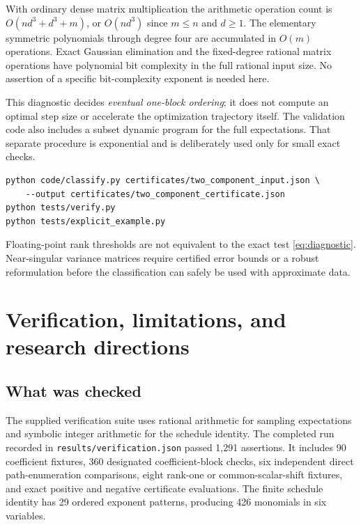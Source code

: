 \documentclass[11pt,letterpaper]{article}
\numberwithin{equation}{section}
\theoremstyle{definition}
\begin{document}
With ordinary dense matrix multiplication the arithmetic operation count is $O(nd^3+d^3+m)$, or $O(nd^3)$ since $m\le n$ and $d\ge1$. The elementary symmetric polynomials through degree four are accumulated in $O(m)$ operations. Exact Gaussian elimination and the fixed-degree rational matrix operations have polynomial bit complexity in the full rational input size. No assertion of a specific bit-complexity exponent is needed here.

This diagnostic decides \emph{eventual one-block ordering}; it does not compute an optimal step size or accelerate the optimization trajectory itself. The validation code also includes a subset dynamic program for the full expectations. That separate procedure is exponential and is deliberately used only for small exact checks.

\begin{lstlisting}
python code/classify.py certificates/two_component_input.json \
    --output certificates/two_component_certificate.json
python tests/verify.py
python tests/explicit_example.py
\end{lstlisting}

Floating-point rank thresholds are not equivalent to the exact test \eqref{eq:diagnostic}. Near-singular variance matrices require certified error bounds or a robust reformulation before the classification can safely be used with approximate data.

\section{Verification, limitations, and research directions}
\label{sec:discussion}

\subsection{What was checked}

The supplied verification suite uses rational arithmetic for sampling expectations and symbolic integer arithmetic for the schedule identity. The completed run recorded in \texttt{results/verification.json} passed 1,291 assertions. It includes 90 coefficient fixtures, 360 designated coefficient-block checks, six independent direct path-enumeration comparisons, eight rank-one or common-scalar-shift fixtures, and exact positive and negative certificate evaluations. The finite schedule identity has 29 ordered exponent patterns, producing 426 monomials in six variables.
\end{document}
